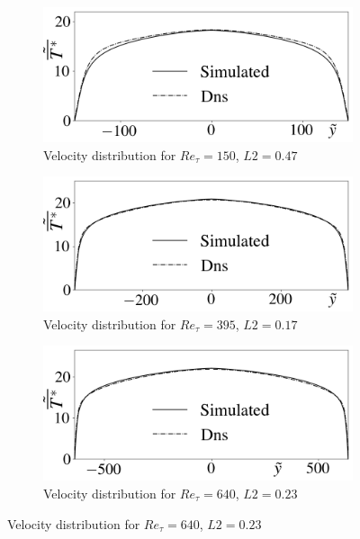 \documentclass[10pt]{article} %
\begin{document}
\begin{figure}[!h]
	\centering
	\begin{subfigure}[t]{0.5\textwidth}
		\centering
		\includegraphics[angle=0, scale=0.24]{fotos_formatacao_final/Temperature_150_Avelocity}
		\caption{Velocity distribution for $Re_\tau = 150$, $L2 = 0.47$}
	\end{subfigure}
	\begin{subfigure}[t]{0.45\textwidth}
		\centering
		\includegraphics[angle=0, scale=0.24]{fotos_formatacao_final/Temperature_395_Avelocity}
		\caption{Velocity distribution for $Re_\tau = 395$, $L2 = 0.17$}
	\end{subfigure}
	\begin{subfigure}[t]{0.5\textwidth}
		\centering
		\includegraphics[angle=0, scale=0.24]{fotos_formatacao_final/Temperature_640_Avelocity}
		\caption{Velocity distribution for $Re_\tau = 640$, $L2 = 0.23$}

\end{subfigure}
\end{figure}
\end{document}
